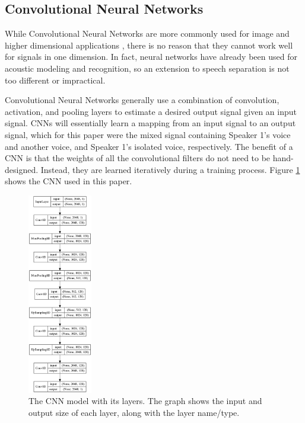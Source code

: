 \documentclass[12pt,chapterheads]{ucsd}
\begin{document}
\subsection{Convolutional Neural Networks}
While Convolutional Neural Networks are more commonly used for image and higher dimensional applications \cite{NIPS2012_4824}, there is no reason that they cannot work well for signals in one dimension. In fact, neural networks have already been used for acoustic modeling and recognition\cite{6296526}, so an extension to speech separation is not too different or impractical.

Convolutional Neural Networks generally use a combination of convolution, activation, and pooling layers to estimate a desired output signal given an input signal. CNNs will essentially learn a mapping from an input signal to an output signal, which for this paper were the mixed signal containing Speaker 1's voice and another voice, and Speaker 1's isolated voice, respectively. The benefit of a CNN is that the weights of all the convolutional filters do not need to be hand-designed. Instead, they are learned iteratively during a training process. Figure \ref{fig:cnn_model} shows the CNN used in this paper.

\begin{figure}[h] 
  \centering
  \includegraphics[width=0.25\textwidth]{pics/model}
  \caption[The CNN model and its layers]
{The CNN model with its layers. The graph shows the input and output size of each layer, along with the layer name/type.}
  \label{fig:cnn_model}
\end{figure}
\end{document}
